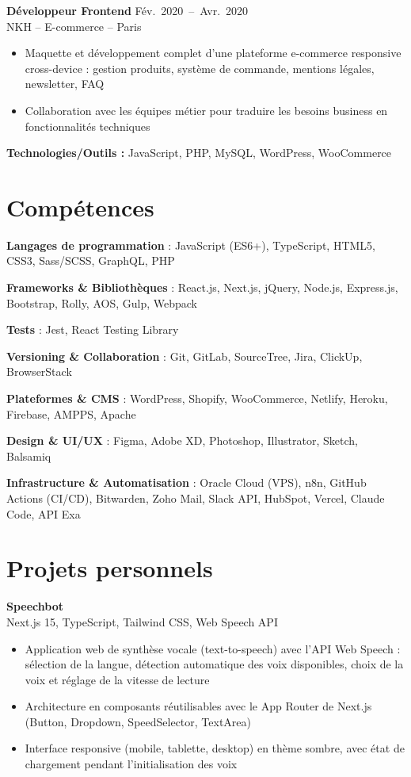 \documentclass[9pt,a4paper]{extarticle}
\newcommand{\secgap}{\vspace{0.8em}}
\newcommand{\entry}[3]{%
  \vspace{0.25em}%
  {\bfseries #1} \hfill {\color{grey}\footnotesize\mbox{#2}}\\[-1pt]
  {\color{accent}\footnotesize #3}\par\vspace{0.1em}%
}
\newcommand{\skill}[2]{\textbf{#1} : #2\par\vspace{1.5pt}}
\begin{document}
{\begin{minipage}[t]{0.488\textwidth}
\entry{Développeur Frontend}{Fév. 2020 -- Avr. 2020}{NKH -- E-commerce -- Paris}
\begin{itemize}
  \item Maquette et développement complet d'une plateforme e-commerce responsive cross-device : gestion produits, système de commande, mentions légales, newsletter, FAQ
  \item Collaboration avec les équipes métier pour traduire les besoins business en fonctionnalités techniques
\end{itemize}
{\footnotesize\textbf{Technologies/Outils :} JavaScript, PHP, MySQL, WordPress, WooCommerce}
\end{minipage}}%
\noindent\usebox{\leftcol}%
\hfill
\begin{minipage}[t]{0.488\textwidth}
\section{Compétences}
\skill{Langages de programmation}{JavaScript (ES6+), TypeScript, HTML5, CSS3, Sass/SCSS, GraphQL, PHP}
\skill{Frameworks \& Bibliothèques}{React.js, Next.js, jQuery, Node.js, Express.js, Bootstrap, Rolly, AOS, Gulp, Webpack}
\skill{Tests}{Jest, React Testing Library}
\skill{Versioning \& Collaboration}{Git, GitLab, SourceTree, Jira, ClickUp, BrowserStack}
\skill{Plateformes \& CMS}{WordPress, Shopify, WooCommerce, Netlify, Heroku, Firebase, AMPPS, Apache}
\skill{Design \& UI/UX}{Figma, Adobe XD, Photoshop, Illustrator, Sketch, Balsamiq}
\skill{Infrastructure \& Automatisation}{Oracle Cloud (VPS), n8n, GitHub Actions (CI/CD), Bitwarden, Zoho Mail, Slack API, HubSpot, Vercel, Claude Code, API Exa}

\secgap
\section{Projets personnels}
\entry{Speechbot}{}{Next.js 15, TypeScript, Tailwind CSS, Web Speech API}
\begin{itemize}
  \item Application web de synthèse vocale (text-to-speech) avec l'API Web Speech : sélection de la langue, détection automatique des voix disponibles, choix de la voix et réglage de la vitesse de lecture
  \item Architecture en composants réutilisables avec le App Router de Next.js (Button, Dropdown, SpeedSelector, TextArea)
  \item Interface responsive (mobile, tablette, desktop) en thème sombre, avec état de chargement pendant l'initialisation des voix
\end{itemize}


\end{minipage}
\end{document}
